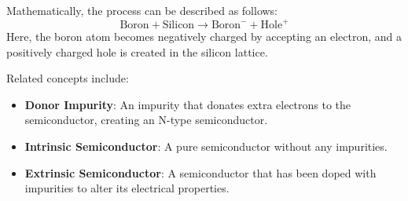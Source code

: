 Mathematically, the process can be described as follows:
\begin{equation}
\text{Boron} + \text{Silicon} \rightarrow \text{Boron}^{-} + \text{Hole}^{+}
\end{equation}
Here, the boron atom becomes negatively charged by accepting an electron, and a positively charged hole is created in the silicon lattice.

Related concepts include:
\begin{itemize}
    \item \textbf{Donor Impurity}: An impurity that donates extra electrons to the semiconductor, creating an N-type semiconductor.
    \item \textbf{Intrinsic Semiconductor}: A pure semiconductor without any impurities.
    \item \textbf{Extrinsic Semiconductor}: A semiconductor that has been doped with impurities to alter its electrical properties.
\end{itemize}

